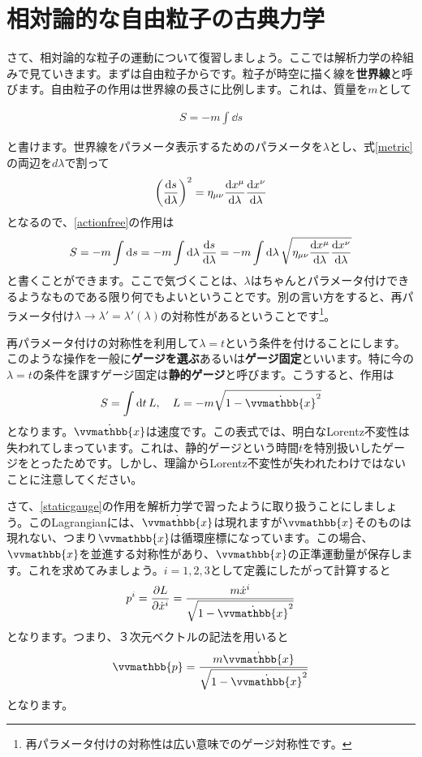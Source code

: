 \documentclass[report,paper=a4, fontsize=12pt, line_length=16cm, number_of_lines=33,dvipdfmx]{jlreq}
\newenvironment{important}{\begin{tcolorbox}[
  colback = white,
  colframe = red!35,
  boxrule = 2mm,
  fonttitle = \bfseries,
  after = \noindent] }{\end{tcolorbox}}
\numberwithin{equation}{chapter}
\newcommand{\strong}[1]{{\sffamily \bfseries #1}}
\newcommand{\xb}{\vvmathbb{x}}
\newcommand{\pbb}{\vvmathbb{p}}
\begin{document}
\section{相対論的な自由粒子の古典力学}
さて、相対論的な粒子の運動について復習しましょう。ここでは解析力学の枠組みで見ていきます。まずは自由粒子からです。粒子が時空に描く線を\strong{世界線}と呼びます。自由粒子の作用は世界線の長さに比例します。これは、質量を$m$として
\begin{important}
  \begin{align}
    S=-m\int \dd{s}\label{actionfree}
  \end{align}    
\end{important}
と書けます。世界線をパラメータ表示するためのパラメータを$\lambda$とし、式\eqref{metric}の両辺を$d\lambda$で割って
\begin{align}
  \qty(\dv{s}{\lambda})^2=\eta_{\mu\nu}\dv{x^{\mu}}{\lambda}\dv{x^{\nu}}{\lambda}
\end{align}
となるので、\eqref{actionfree}の作用は
\begin{align}
  S=-m\int \dd{s}
  =-m\int \dd{\lambda}\dv{s}{\lambda}
  =-m\int \dd{\lambda}\sqrt{\eta_{\mu\nu}\dv{x^{\mu}}{\lambda}\dv{x^{\nu}}{\lambda}}
\end{align}
と書くことができます。ここで気づくことは、$\lambda$はちゃんとパラメータ付けできるようなものである限り何でもよいということです。別の言い方をすると、再パラメータ付け$\lambda\to \lambda'=\lambda'(\lambda)$の対称性があるということです\footnote{再パラメータ付けの対称性は広い意味でのゲージ対称性です。}。

再パラメータ付けの対称性を利用して$\lambda=t$という条件を付けることにします。このような操作を一般に\strong{ゲージを選ぶ}あるいは\strong{ゲージ固定}といいます。特に今の$\lambda=t$の条件を課すゲージ固定は\strong{静的ゲージ}と呼びます。こうすると、作用は
\begin{align}
  S=\int \dd{t} L,\quad L=-m\sqrt{1-\dot{\xb}^2}\label{staticgauge}
\end{align}
となります。$\dot{\xb}$は速度です。この表式では、明白なLorentz不変性は失われてしまっています。これは、静的ゲージという時間$t$を特別扱いしたゲージをとったためです。しかし、理論からLorentz不変性が失われたわけではないことに注意してください。

さて、\eqref{staticgauge}の作用を解析力学で習ったように取り扱うことにしましょう。このLagrangianには、$\dot{\xb}$は現れますが$\xb$そのものは現れない、つまり$\xb$は循環座標になっています。この場合、$\xb$を並進する対称性があり、$\xb$の正準運動量が保存します。これを求めてみましょう。$i=1,2,3$として定義にしたがって計算すると
\begin{align}
  p^i=\pdv{L}{\dot{x}^i}=\frac{m\dot{x}^i}{\sqrt{1-\dot{\xb}^2}}
\end{align}
となります。つまり、３次元ベクトルの記法を用いると
\begin{align}
  \pbb=\frac{m\dot{\xb}}{\sqrt{1-\dot{\xb}^2}}
\end{align}
となります。
\end{document}
